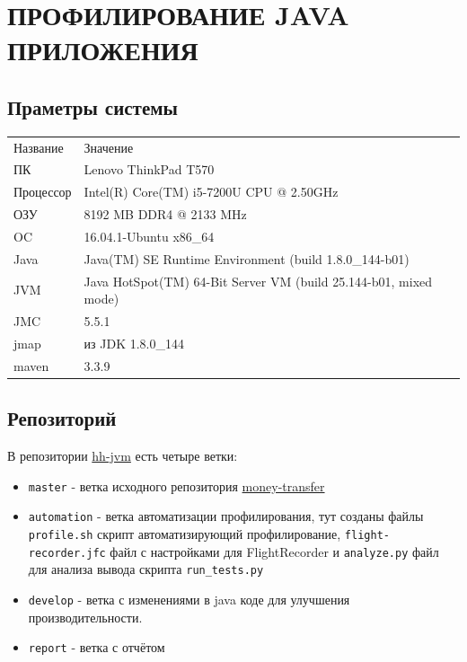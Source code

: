 \documentclass{article}
\begin{document}
	\section*{ПРОФИЛИРОВАНИЕ JAVA ПРИЛОЖЕНИЯ}
	\subsection*{Праметры системы}
	\begin{tabular}{ll}
		Название      & Значение                                  \\
		ПК            & Lenovo ThinkPad T570                      \\
		Процессор     & Intel(R) Core(TM) i5-7200U CPU @ 2.50GHz  \\
		ОЗУ           & 8192 MB DDR4 @ 2133 MHz                   \\
		OC            & 16.04.1-Ubuntu x86\_64                     \\
		Java          & Java(TM) SE Runtime Environment (build 1.8.0\_144-b01) \\
		JVM           & Java HotSpot(TM) 64-Bit Server VM (build 25.144-b01, mixed mode) \\
		JMC           & 5.5.1                                     \\
		jmap          & из JDK 1.8.0\_144                          \\
		maven          & 3.3.9                                     \\
	\end{tabular}

	\subsection*{Репозиторий}
		В репозитории  \href{https://github.com/eremeykin/hh-jvm/}{hh-jvm} есть четыре ветки:
		\begin{itemize}
			 \item \texttt{master} - ветка исходного репозитория \href{https://github.com/yarkinsv/money-transfer}{money-transfer}
			 \item \texttt{automation} - ветка автоматизации профилирования, тут созданы файлы \texttt{profile.sh} скрипт автоматизирующий профилирование,
			  \texttt{flight-recorder.jfc} файл с настройками для FlightRecorder и \texttt{analyze.py} файл для анализа вывода скрипта \texttt{run\_tests.py}
			 \item \texttt{develop} - ветка с изменениями в java коде для улучшения производительности.
			 \item \texttt{report} - ветка с отчётом			 
		\end{itemize}
\end{document}
